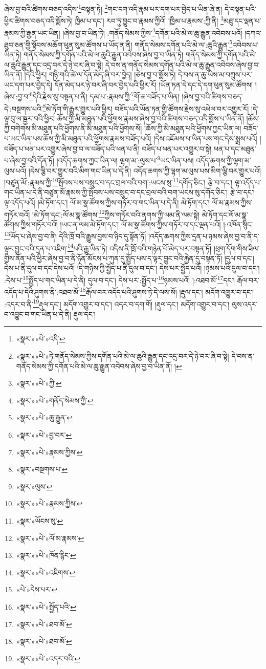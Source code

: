 ཞེས་བྱ་བའི་ཚིགས་བཅད་འདིས་\footnote{«སྣར་»«པེ་»འདི་}བསྟན་ཏེ། \footnote{«སྣར་»«པེ་»ཏེ་གནོད་སེམས་ཀྱིས་དགོན་པའི་མེ་ལ་ཆུའི་རྒྱུན་དང་འདྲ་བར་དེ་ཉེ་བར་ཞི་བ་སྟེ། དེ་བས་ན་གནོད་སེམས་ཀྱི་དགོན་པའི་མེ་ལ་ཆུ་རྒྱུན་འབེབས་ཞེས་བྱ་བ་ཡིན་ནོ། ། }གང་དག་འདི་རྣམ་པར་དག་པར་བྱེད་པ་ཡིན་ཞེ་ན། དེ་བསྟན་པའི་ཕྱིར་ཚིགས་བཅད་འདི་སྨོས་ཏེ། ཁྱིམ་པ་དང་། རབ་ཏུ་བྱུང་བ་རྣམས་ཀྱིའོ། །ཁྱིམ་པ་རྣམས་:ཀྱི་ནི། \footnote{«སྣར་»«པེ་»ཀྱི་}མཐུ་དང་ལྡན་པ་རྣམས་ཀྱི་རྒྱན་ཡང་ཡིན། །ཞེས་བྱ་བ་ཡིན་ཏེ། :གནོད་སེམས་ཀྱིས་\footnote{«སྣར་»«པེ་»གནོད་སེམས་ཀྱི་}དགོན་པའི་མེ་ལ་ཆུ་རྒྱུན་འབེབས་པའོ། །དཀའ་ཐུབ་ཅན་གྱི་སྟོབས་མཆོག་ཕུན་སུམ་ཚོགས་པ་ཡོད་ན་ནི། གནོད་སེམས་དགོན་པའི་མེ་ལ་:ཆུའི་རྒྱུན་\footnote{«སྣར་»«པེ་»ཆུ་རྒྱུན་}འབེབས་པ་ཡིན་ཏེ། གནོད་སེམས་ཀྱི་དགོན་པའི་མེ་ལ་ཆུའི་རྒྱུན་འབེབས་ཞེས་བྱ་བ་ཡིན་ཏེ། གནོད་སེམས་ཀྱི་དགོན་པའི་མེ་ལ་ཆུའི་རྒྱུན་དང་འདྲ་བར་དེ་ཉེ་བར་ཞི་བ་སྟེ། དེ་བས་ན་གནོད་སེམས་དགོན་པའི་མེ་ལ་ཆུ་རྒྱུན་འབེབས་ཞེས་བྱ་བ་ཡིན་ནོ། །དེའི་ཕྱིར། གཉི་གའི་ཚེ་ལ་དོན་མེད་ཞི་བར་བྱེད། །ཅེས་བྱ་བ་སྨོས་ཏེ། དེ་བས་ན་ཆུ་ཡིས་མ་བཀྲུས་པར་ཡང་དག་པར་བྱེད་དེ། དོན་མེད་པར་ཉེ་བར་ཞི་བར་བྱེད་པའི་ཕྱིར་རོ། །ཡོན་ཏན་དེ་དང་དེ་དག་ཕུན་སུམ་ཚོགས། །ཞེས་:བྱ་བ་\footnote{«སྣར་»«པེ་»བྱ་བར་}དེའི་རྗེས་སུ་བསྟན་པ་ནི། དམ་པ་:རྣམས་ཀྱི་\footnote{«སྣར་»«པེ་»རྣམས་ཀྱིས་}གོ་ཆ་བཟོད་པ་ཡིན། །ཞེས་བྱ་བའི་ཚིགས་བཅད་དེ་:བསྔགས་པའི་\footnote{«སྣར་»བསྔགས་པ་}མེ་ཏོག་གི་རྒྱུར་གྱུར་པའི་ཕྱིར། བཟོད་པའི་ཡོན་ཏན་གྱི་ཚོགས་རྗེས་སུ་འཕེལ་བར་འགྱུར་རོ། །དེ་ལྟ་བུ་ལ་སྦྱར་བའི་ཕྱིར། ཆོས་ཀྱི་མི་མཐུན་པའི་ཕྱོགས་རྣམས་ཞེས་བྱ་བའི་ཚིགས་བཅད་འདི་སྨོས་པ་ཡིན་ནོ། །ཆོས་ཀྱི་བགེགས་མི་མཐུན་པའི་ཕྱོགས་ནི་མི་མཐུན་པའི་ཕྱོགས་སོ། །ཆོས་ཀྱི་མི་མཐུན་པའི་ཕྱོགས་ཀྱང་ཡིན་ལ། བཟོད་པ་ཡང་ཡིན་པས་ཆོས་ཀྱི་མི་མཐུན་པའི་ཕྱོགས་རྣམས་བཟོད་པའོ། །དེས་འཇོམས་པ་ཡིན་པས་གང་དེས་སྨྲས་པའོ། །བཟོད་པ་ཕན་པར་འགྱུར་ཞེས་བྱ་བ་ལ་བཟོད་པའི་ཕན་པ་ནི། བཟོད་པ་ཕན་པར་འགྱུར་བ་སྟེ། ཕན་པ་དང་མཐུན་པ་ཞེས་བྱ་བའི་དོན་ཏོ། །འདོད་ཆགས་ཀྱང་ཡིན་ལ། ལྷག་མ་:ལུས་པ་\footnote{«སྣར་»ལུས་}ཡང་ཡིན་པས། འདོད་ཆགས་ཀྱི་ལྷག་མ་ལུས་པའོ། །དེས་ལྕི་བར་གྱུར་བའི་མིག་གང་ཡིན་པ་དེ་ནི། འདོད་ཆགས་ཀྱི་ལྷག་མ་ལུས་པས་མིག་ལྕི་བར་གྱུར་པའོ། །བཙུན་མོ་:རྣམས་ཀྱི་\footnote{«སྣར་»«པེ་»རྣམས་ཀྱིས་}སྤོབས་པས་བསྲུང་བ་དང་བྲལ་བའི་བག་:ཡངས་སུ་\footnote{«སྣར་»ཡོངས་སུ་}དགོད་ཅིང་། རྩེ་བ་དང་། ལྟ་འདོད་པ་གང་ཡིན་པ་དེ་ནི་བཙུན་མོ་རྣམས་ཀྱི་སྤོབས་པས་བསྲུང་བ་དང་བྲལ་བའི་བག་ཡངས་སུ་དགོད་ཅིང་། རྩེ་བ་དང་། ལྟ་འདོད་པའོ། །མེ་ཏོག་དང་། ལོ་མ་སྣ་ཚོགས་ཀྱིས་གཏོར་བ་གང་ཡིན་པ་དེ་ནི། མེ་ཏོག་དང་། ལོ་མ་རྣམས་ཀྱིས་གཏོར་བའོ། །མེ་ཏོག་དང་:ལོ་མ་སྣ་ཚོགས་\footnote{«སྣར་»«པེ་»ལོ་མ་རྣམས་}ཀྱིས་གཏོར་བའི་ནགས་ཀྱི་ལམ་ནི་ལམ་སྟེ། མེ་ཏོག་དང་ལོ་མ་སྣ་ཚོགས་ཀྱིས་གཏོར་བའོ། །ཡང་ན་ལམ་མེ་ཏོག་དང་། ལོ་མ་སྣ་ཚོགས་ཀྱིས་གཏོར་བ་དང་ལྡན་པའོ། །:འཁོན་སྙིང་\footnote{«སྣར་»«པེ་»ཁོན་རྙིང་}ཡོད་པ་ཞེས་བྱ་བ་ནི། དེའི་ཁྲོ་བའི་རྒྱུས་བྱས་བ་ཉིད་དུ་སྟོན་ཏོ། །འདོད་ཆགས་ཀྱིས་དྲན་པ་ཉམས་ཞེས་བྱ་བ་ནི་ད་ལྟར་བྱུང་བའི་དྲན་པ་འཇིག་\footnote{«སྣར་»«པེ་»འཇིགས་}པའི་རྒྱུ་ཡིན་ཏེ། འདིས་ནི་ཁྲོ་བའི་གཉེན་པོ་མེད་པར་བསྟན་ཏོ། །ཕྲག་དོག་གིས་ཟིལ་གྱིས་ནོན་པའི་ཕྱིར་ཞེས་བྱ་བ་ནི་ཉོན་མོངས་པ་ཀུན་དུ་སྤྱོད་པས་ད་ལྟར་བྱུང་བའི་རྐྱེན་དུ་བསྟན་ཏོ། །དུལ་བ་དང་། དེས་པ་ནི་དུལ་བ་དང་དེས་པའོ། །དེ་གཉིས་ཀྱི་སྤྱོད་པ་ནི་དུལ་བ་དང་། དེས་པར་སྤྱོད་པའོ། །ཉམས་པའི་དུལ་བ་དང་། :དེས་པ་\footnote{«པེ་»དེས་པར་}སྤྱོད་པ་གང་ཡིན་པ་དེ་ནི། དུལ་བ་དང་། དེས་པར་:སྤྱོད་པ་\footnote{«སྣར་»«པེ་»སྤྱོད་པའི་}ཉམས་པའོ། །:འཐབ་མོ་\footnote{«སྣར་»«པེ་»ཐབ་མོ་}དང་། རྒོལ་བར་འདོད་པ་དེའི་ཤུགས་ནི་:འཐབ་མོ་\footnote{«སྣར་»«པེ་»ཐབ་མོ་}རྒོལ་བར་འདོད་པའི་ཤུགས་ཏེ་དེ་ལས་སོ། །རྡུལ་དང་། མདོག་འགྱུར་བ་དང་། :འདར་བ་ནི་\footnote{«སྣར་»«པེ་»འདར་བའི་}རྡུལ་དང་། མདོག་འགྱུར་བ་དང་། འདར་བ་དག་གོ། །རྡུལ་དང་། མདོག་འགྱུར་བ་དང་། ལུས་འདར་བ་འབྱུང་བ་གང་ཡིན་པ་དེ་ནི། རྡུལ་དང་། 